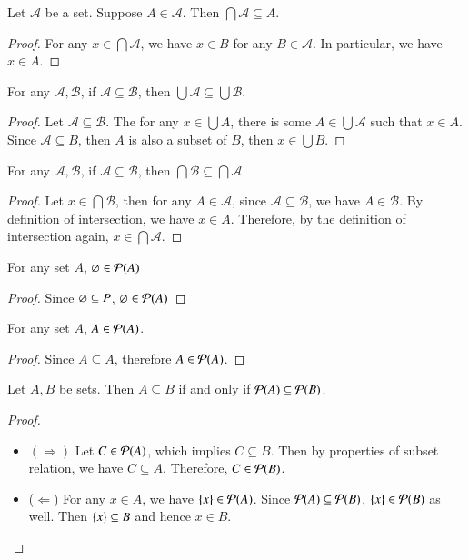 \begin{prop}
    Let $\mathscr A$ be a set. Suppose $A\in\mathscr A$. Then $\bigcap\mathscr A\subseteq A$.
\end{prop}
\begin{proof}
    For any $x\in \bigcap\mathscr A$, we have $x\in B$ for any $B\in\mathscr A$. In particular, we have $x\in A$. 
\end{proof}
\begin{prop}
    For any $\mathscr A, \mathscr B$, if $\mathscr A\subseteq \mathscr B$, then $\bigcup\mathscr A\subseteq \bigcup\mathscr B$.
\end{prop}
\begin{proof}
    Let $\mathscr A\subseteq \mathscr B$. The for any $x\in \bigcup A$, there is some $A\in\bigcup \mathscr A$ such that $x\in A$. Since $\mathscr A\subseteq B$, then $A$ is also a subset of $B$, then $x\in \bigcup B$.
\end{proof}
\begin{prop}
    For any $\mathscr A, \mathscr B$, if $\mathscr A\subseteq \mathscr B$, then $\bigcap \mathscr B\subseteq \bigcap\mathscr A$
\end{prop}
\begin{proof}
    Let $x\in\bigcap\mathscr B$, then for any $A\in\mathscr A$, since $\mathscr A\subseteq \mathscr B$, we have $A\in\mathscr B$. By definition of intersection, we have $x\in A$. Therefore, by the definition of intersection again, $x\in \bigcap\mathscr A$.
\end{proof}
\begin{prop}
    For any set $A$, $\varnothing\in\mathcal{P}(A)$
\end{prop}
\begin{proof}
    Since $\varnothing\subseteq P$, $\varnothing\in \mathcal{P}(A)$
\end{proof}
\begin{prop}
    For any set $A$, $A\in\mathcal{P}(A)$.
\end{prop}
\begin{proof}
    Since $A\subseteq A$, therefore $A\in\mathcal{P}(A)$.
\end{proof}
\begin{prop}
    Let $A,B$ be sets. Then $A\subseteq B$ if and only if $\mathcal{P}(A)\subseteq \mathcal{P}(B)$.
\end{prop}
\begin{proof}
    ~
    \begin{itemize}
        \item $(\Rightarrow)$ Let $C\in\mathcal{P}(A)$, which implies $C\subseteq B$. Then by properties of subset relation, we have $C\subseteq A$. Therefore, $C\in \mathcal{P}(B)$.
        \item ($\Leftarrow$) For any $x\in A$, we have $\{x\}\in\mathcal{P}(A)$. Since $\mathcal{P}(A)\subseteq \mathcal{P}(B)$, $\{x\}\in\mathcal{P}(B)$ as well. Then $\{x\}\subseteq B$ and hence $x\in B$.
    \end{itemize}
\end{proof}
